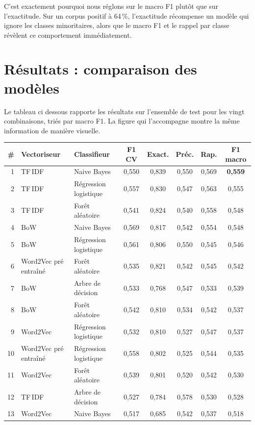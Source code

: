 \documentclass[11pt,a4paper]{article}
\begin{document}
C'est exactement pourquoi nous réglons sur le macro F1 plutôt que sur l'exactitude. Sur
un corpus positif à 64\,\%, l'exactitude récompense un modèle qui ignore les classes
minoritaires, alors que le macro F1 et le rappel par classe révèlent ce comportement
immédiatement.

\section{Résultats : comparaison des modèles}
Le tableau ci dessous rapporte les résultats sur l'ensemble de test pour les vingt
combinaisons, triés par macro F1. La figure qui l'accompagne montre la même information
de manière visuelle.

\begin{table}[H]
\centering
\small
\begin{tabular}{rllccccc}
\toprule
\# & \textbf{Vectoriseur} & \textbf{Classifieur} & \textbf{F1 CV} & \textbf{Exact.} & \textbf{Préc.} & \textbf{Rap.} & \textbf{F1 macro} \\
\midrule
1  & TF\,IDF & Naive Bayes & 0,550 & 0,839 & 0,550 & 0,569 & \textbf{0,559} \\
2  & TF\,IDF & Régression logistique & 0,557 & 0,830 & 0,547 & 0,563 & 0,555 \\
3  & TF\,IDF & Forêt aléatoire & 0,541 & 0,824 & 0,540 & 0,558 & 0,548 \\
4  & BoW & Naive Bayes & 0,569 & 0,817 & 0,542 & 0,554 & 0,548 \\
5  & BoW & Régression logistique & 0,561 & 0,806 & 0,550 & 0,545 & 0,546 \\
6  & Word2Vec pré entraîné & Forêt aléatoire & 0,535 & 0,821 & 0,542 & 0,545 & 0,542 \\
7  & BoW & Arbre de décision & 0,533 & 0,768 & 0,547 & 0,533 & 0,539 \\
8  & BoW & Forêt aléatoire & 0,542 & 0,810 & 0,534 & 0,542 & 0,537 \\
9  & Word2Vec & Régression logistique & 0,532 & 0,810 & 0,527 & 0,547 & 0,537 \\
10 & Word2Vec pré entraîné & Régression logistique & 0,558 & 0,802 & 0,525 & 0,544 & 0,535 \\
11 & Word2Vec & Forêt aléatoire & 0,539 & 0,801 & 0,520 & 0,542 & 0,530 \\
12 & TF\,IDF & Arbre de décision & 0,527 & 0,784 & 0,578 & 0,530 & 0,528 \\
13 & Word2Vec & Naive Bayes & 0,517 & 0,685 & 0,542 & 0,537 & 0,518 \\

\end{tabular}
\end{table}
\end{document}
